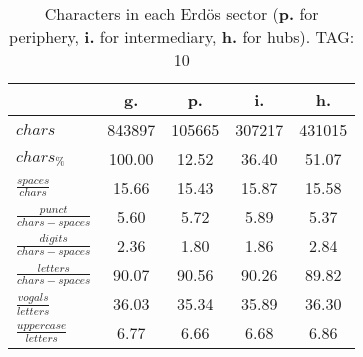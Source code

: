 \begin{table}[h!]
\begin{center}
\begin{tabular}{| l || c | c | c | c |}\hline
 & {\bf g.} & {\bf p.} & {\bf i.} & {\bf h.} \\\hline\hline
$chars$ & 843897  & 105665  & 307217  & 431015 \\
$chars_{\%}$ & 100.00  & 12.52  & 36.40  & 51.07 \\\hline
$\frac{spaces}{chars}$ & 15.66  & 15.43  & 15.87  & 15.58 \\
$\frac{punct}{chars-spaces}$ & 5.60  & 5.72  & 5.89  & 5.37 \\
$\frac{digits}{chars-spaces}$ & 2.36  & 1.80  & 1.86  & 2.84 \\\hline
$\frac{letters}{chars-spaces}$ & 90.07  & 90.56  & 90.26  & 89.82 \\
$\frac{vogals}{letters}$ & 36.03  & 35.34  & 35.89  & 36.30 \\
$\frac{uppercase}{letters}$ & 6.77  & 6.66  & 6.68  & 6.86 \\\hline
\end{tabular}
\caption{Characters in each Erd\"os sector ({{\bf p.}} for periphery, {{\bf i.}} for intermediary, 
    {{\bf h.}} for hubs). TAG: 10}
\end{center}
\end{table}